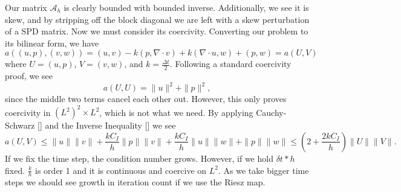 \documentclass[11pt]{article}
\begin{document}
Our matrix $\mathscr{A}_h$ is clearly bounded with bounded inverse. Additionally, we see it is skew, and by stripping off the block diagonal we are left with a skew perturbation of a SPD matrix. Now we must consider its coercivity. Converting our problem to its bilinear form, we have
\begin{equation}\label{bilinear}
a((u,p),(v,w)) = (u,v) - k(p, \nabla \cdot v) + k(\nabla \cdot u,w) + (p,w) = a(U,V)
\end{equation}
where $U = (u,p)$, $V = (v,w)$, and $k = \frac{\Delta t}{2}$. Following a standard coercivity proof, we see
\begin{equation}
a(U,U) = \|u\|^2 + \|p\|^2,
\end{equation}
since the middle two terms cancel each other out. However, this only proves coercivity in $(L^2)^2 \times L^2$, which is not what we need.
By applying Cauchy-Schwarz [] and the Inverse Inequality [] we see
\begin{equation}
a(U,V) \leq \|u\|\|v\| + \frac{kC_I}{h}\|p\|\|v\| + \frac{kC_I}{h}\|u\|\|w\| + \|p\|\|w\| \leq \left(2 + \frac{2kC_I}{h}\right)\|U\|\|V\|.
\end{equation}
If we fix the time step, the condition number grows. However, if we hold $\delta t * h$ fixed. $\frac{k}{h}$ is order 1 and it is continuous and coercive on $L^2$. As we take bigger time steps we should see growth in iteration count if we use the Riesz map.
\end{document}
